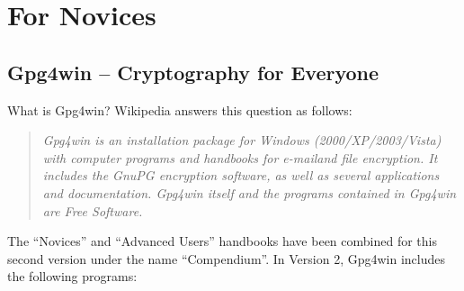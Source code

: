 \documentclass[a4paper,11pt,oneside,openright,titlepage]{scrbook}
\newcommand{\Email}{e-mail}
\begin{document}
\cleardoublepage
{}
\tableofcontents

\clearpage
\part{For Novices}

\label{part:Novices}


\chapter{Gpg4win -- Cryptography for Everyone}

What is Gpg4win? Wikipedia answers this question as follows:

\begin{quote}
    \textit{Gpg4win is an installation package for Windows
    (2000/XP/2003/Vista) with computer programs and
    handbooks for \Email{}and file encryption. It includes the
    GnuPG encryption software, as well as several applications and
    documentation. Gpg4win itself and the programs contained in
    Gpg4win are Free Software.}
\end{quote}

The ``Novices'' and ``Advanced Users'' handbooks have been combined for
this second version under the name ``Compendium''. In Version 2,
Gpg4win includes the following programs:
\end{document}
